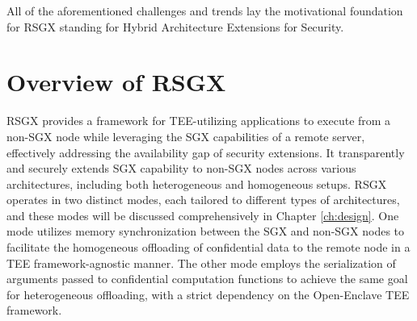 \documentclass[article, doublespace,nopageskip]{VTthesis} %
\newcommand{\monitor}{RSGX \xspace}
\begin{document}
    All of the aforementioned challenges and trends lay the motivational foundation for \monitor standing for Hybrid Architecture Extensions for Security.

    \section{Overview of \monitor}
    \monitor provides a framework for TEE-utilizing applications to execute from a non-SGX node while leveraging the SGX capabilities of a remote server, effectively addressing the availability gap of security extensions. It transparently and securely extends SGX capability to non-SGX nodes across various architectures, including both heterogeneous and homogeneous setups. \monitor operates in two distinct modes, each tailored to different types of architectures, and these modes will be discussed comprehensively in Chapter \ref{ch:design}. One mode utilizes memory synchronization between the SGX and non-SGX nodes to facilitate the homogeneous offloading of confidential data to the remote node in a TEE framework-agnostic manner. The other mode employs the serialization of arguments passed to confidential computation functions to achieve the same goal for heterogeneous offloading, with a strict dependency on the Open-Enclave TEE framework.
    
\end{document}
